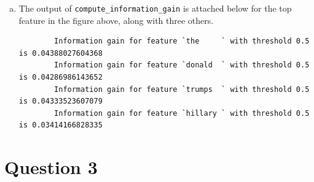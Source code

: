 \documentclass{article}
\begin{document}
\begin{enumerate}[(a)]
    \item The output of \texttt{compute\_information\_gain} is attached below for the top feature in the figure above, along with three others. 
    
    \begin{verbatim}
        Information gain for feature `the     ` with threshold 0.5 is 0.04388027604368
        Information gain for feature `donald  ` with threshold 0.5 is 0.04286986143652
        Information gain for feature `trumps  ` with threshold 0.5 is 0.04333523607079
        Information gain for feature `hillary ` with threshold 0.5 is 0.03414166828335
    \end{verbatim}

\end{enumerate}


\section*{Question 3}

\newcommand{\J}{\mathcal{\mathcal{J}^{\alpha\beta}_{\text{reg}}}}
\newcommand{\sgn}{\mathcal{\text{sgn}}}
\end{document}
